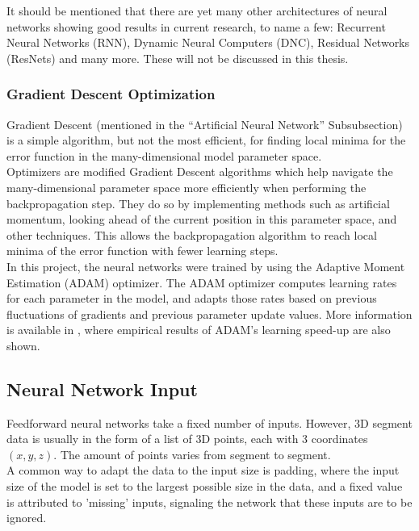 It should be mentioned that there are yet many other architectures of neural networks showing good results in current research, to name a few: Recurrent Neural Networks (RNN), Dynamic Neural Computers (DNC), Residual Networks (ResNets) and many more. These will not be discussed in this thesis.\\

\subsubsection{Gradient Descent Optimization}

Gradient Descent (mentioned in the ``Artificial Neural Network'' Subsubsection) is a simple algorithm, but not the most efficient, for finding local minima for the error function in the many-dimensional model parameter space.\\

Optimizers are modified Gradient Descent algorithms which help navigate the many-dimensional parameter space more efficiently when performing the backpropagation step. They do so by implementing methods such as artificial momentum, looking ahead of the current position in this parameter space, and other techniques. This allows the backpropagation algorithm to reach local minima of the error function with fewer learning steps.\\

In this project, the neural networks were trained by using the Adaptive Moment Estimation (ADAM) optimizer. The ADAM optimizer computes learning rates for each parameter in the model, and adapts those rates based on previous fluctuations of gradients and previous parameter update values.  
More information is available in \citet{adam}, where empirical results of ADAM's learning speed-up are also shown.

\subsection{Neural Network Input}
\label{subsec:NNinput}

Feedforward neural networks take a fixed number of inputs. However, 3D segment data is usually in the form of a list of 3D points, each with 3 coordinates $(x,y,z)$. The amount of points varies from segment to segment.\\

A common way to adapt the data to the input size is padding, where the input size of the model is set to the largest possible size in the data, and a fixed value is attributed to 'missing' inputs, signaling the network that these inputs are to be ignored.\\

